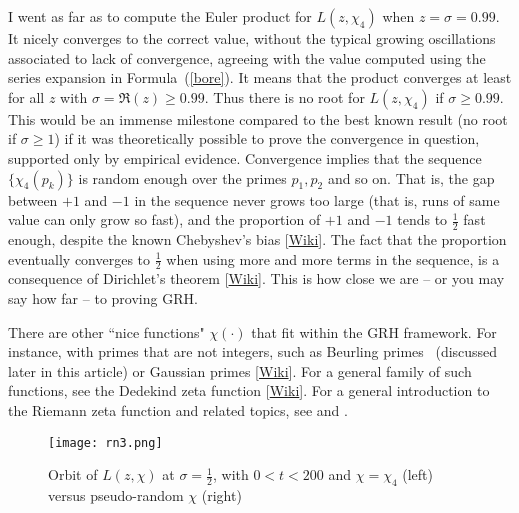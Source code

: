 \documentclass[oneside,10pt]{book}
\begin{document}
I went as far as to compute the Euler product for $L(z,\chi_4)$ when $z=\sigma=0.99$. It nicely converges to the correct value, without the typical 
 growing oscillations associated to lack of convergence, 
 agreeing with the value computed using the series expansion in Formula~(\ref{bore}). It means that the product converges at least for all $z$ with
 $\sigma=\Re(z)\geq 0.99$. Thus there is no root for $L(z,\chi_4)$ if $\sigma\geq 0.99$. This would be an immense milestone compared to the best known result (no root if $\sigma\geq 1$) if it was theoretically possible to prove the convergence in question, supported only by empirical evidence. 
 Convergence implies that the sequence $\{\chi_4(p_k)\}$ is random enough over the primes $p_1,p_2$ and so on. That is, the gap between $+1$ and $-1$ in the sequence never grows too large (that is, runs of same value can only grow so fast), and the proportion of $+1$ and $-1$ tends to $\frac{1}{2}$ fast enough, despite the known \textcolor{index}{Chebyshev's bias} [\href{https://en.wikipedia.org/wiki/Chebyshev\%27s_bias}{Wiki}]. The fact that the proportion eventually converges to $\frac{1}{2}$ when using more and more terms in the sequence, is a consequence 
 of \textcolor{index}{Dirichlet's theorem} [\href{https://en.wikipedia.org/wiki/Dirichlet\%27s_theorem_on_arithmetic_progressions}{Wiki}]. This is how close we are -- or you may say how far -- to proving GRH.

There are other ``nice functions" $\chi(\cdot)$ that fit within the GRH framework. For instance, with primes that are not integers, such as Beurling primes~\cite{bzf2004} (discussed later in this article) or \textcolor{index}{Gaussian primes} [\href{https://en.wikipedia.org/wiki/Gaussian_integer}{Wiki}]. For a general family of such functions, see the \textcolor{index}{Dedekind zeta function} [\href{https://en.wikipedia.org/wiki/Dedekind_zeta_function}{Wiki}]. For a general introduction to the Riemann zeta function and related topics, see \cite{kconrad2018} and \cite{tdr1987}.

\begin{figure}[H]
\centering
\texttt{[image: rn3.png]}  
\caption{Orbit of $L(z,\chi)$ at $\sigma=\frac{1}{2}$, with $0<t<200$ and $\chi=\chi_4$ (left) versus pseudo-random $\chi$ (right)}
\label{fig:rn2x}
\end{figure}
\end{document}
